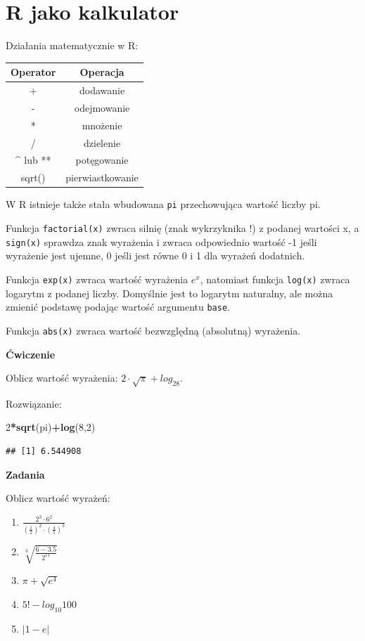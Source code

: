 \documentclass[]{book}
\newenvironment{Shaded}{\begin{snugshade}}{\end{snugshade}}
\newcommand{\KeywordTok}[1]{\textcolor[rgb]{0.13,0.29,0.53}{\textbf{#1}}}
\newcommand{\DecValTok}[1]{\textcolor[rgb]{0.00,0.00,0.81}{#1}}
\newcommand{\OperatorTok}[1]{\textcolor[rgb]{0.81,0.36,0.00}{\textbf{#1}}}
\newcommand{\NormalTok}[1]{#1}
\providecommand{\tightlist}{%
  \setlength{\itemsep}{0pt}\setlength{\parskip}{0pt}}
\begin{document}
\section{R jako kalkulator}\label{r-jako-kalkulator}

Działania matematycznie w R:

\begin{longtable}[]{@{}cc@{}}
\toprule
Operator & Operacja\tabularnewline
\midrule
\endhead
+ & dodawanie\tabularnewline
- & odejmowanie\tabularnewline
* & mnożenie\tabularnewline
/ & dzielenie\tabularnewline
\^{} lub ** & potęgowanie\tabularnewline
sqrt() & pierwiastkowanie\tabularnewline
\bottomrule
\end{longtable}

W R istnieje także stała wbudowana \texttt{pi} przechowująca wartość
liczby pi.

Funkcja \texttt{factorial(x)} zwraca silnię (znak wykrzyknika !) z
podanej wartości x, a \texttt{sign(x)} sprawdza znak wyrażenia i zwraca
odpowiednio wartość -1 jeśli wyrażenie jest ujemne, 0 jeśli jest równe 0
i 1 dla wyrażeń dodatnich.

Funkcja \texttt{exp(x)} zwraca wartość wyrażenia \(e^x\), natomiast
funkcja \texttt{log(x)} zwraca logarytm z podanej liczby. Domyślnie jest
to logarytm naturalny, ale można zmienić podstawę podając wartość
argumentu \texttt{base}.

Funkcja \texttt{abs(x)} zwraca wartość bezwzględną (absolutną)
wyrażenia.

\textbf{Ćwiczenie}

Oblicz wartość wyrażenia: \(2\cdot \sqrt{\pi} + log_28\).

Rozwiązanie:

\begin{Shaded}
\begin{Highlighting}[]
\DecValTok{2}\OperatorTok{*}\KeywordTok{sqrt}\NormalTok{(pi)}\OperatorTok{+}\KeywordTok{log}\NormalTok{(}\DecValTok{8}\NormalTok{,}\DecValTok{2}\NormalTok{)}
\end{Highlighting}
\end{Shaded}

\begin{verbatim}
## [1] 6.544908
\end{verbatim}

\textbf{Zadania}

Oblicz wartość wyrażeń:

\begin{enumerate}
\def\labelenumi{\arabic{enumi}.}
\tightlist
\item
  \(\frac{2^3\cdot6^2}{(\frac{1}{2})^2\cdot(\frac{4}{5})^3}\)
\item
  \(\sqrt[3]{\frac{6-3.5}{2^{11}}}\)
\item
  \(\pi+\sqrt{e^4}\)
\item
  \(5! - log_{10}100\)
\item
  \(|1-e|\)
\end{enumerate}
\end{document}
